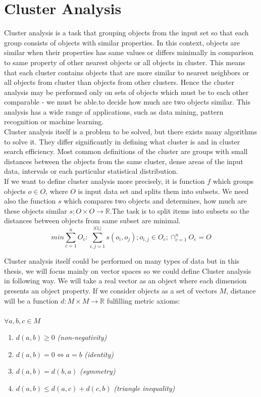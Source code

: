 \chapter{Cluster Analysis} \label{sec:clusteranalysis}
Cluster analysis is a task that grouping objects from the input set so that each group consists of objects with similar properties. In this context, objects are similar when their properties has same values or differs minimally in comparison to same property of other nearest objects or all objects in cluster. This means that each cluster contains objects that are more similar to nearest neighbors or all objects from cluster than objects from other clusters. Hence the cluster analysis may be performed only on sets of objects which must be to each other comparable - we must be able.to decide how much are two objects similar. This analysis has a wide range of applications, such as data mining, pattern recognition or machine learning.\\
Cluster analysis itself is a problem to be solved, but there exists many algorithms to solve it. They differ significantly in defining what cluster is and in cluster search efficiency. Most common definitions of the cluster are groups with small distances between the objects from the same cluster, dense areas of the input data, intervals or each particular statistical distribution.\\
If we want to define cluster analysis more precisely, it is function $f$ which groups objects $o \in O$, where $O$ is input data set and splits them into subsets. We need also the function $s$ which compares two objects and determines, how much are these objects similar $s: O \times O \to \mathbb{R}$.The task is to split items into subsets so the distances between objects from same subset are minimal. $$min \sum_{c=1}^nO_c:\sum_{i,j=1}^{|O_c|}s(o_i,o_j);o_{i,j}\in O_c;\cap_{c=1}^nO_c=O$$

Cluster analysis itself could be performed on many types of data but in this thesis, we will focus mainly on vector spaces so we could define Cluster analysis in following way.
We will take a real vector as an object where each dimension presents an object property. If we consider objects as a set of vectors $M$, distance will be a function $d:M\times M \to \mathbb{R}$ fulfilling metric axioms:\\ \\
$ \forall  a,b,c \in M$
\begin{enumerate}
\item $d(a,b)\geq 0$ \textit{(non-negativity)}
\item $d(a,b) = 0 \iff a = b$ \textit{(identity)}
\item $d(a,b) = d(b,a)$ \textit{(symmetry)}
\item$d(a,b) \leq d(a,c) + d(c,b)$ \textit{(triangle inequality)}
\end{enumerate}

